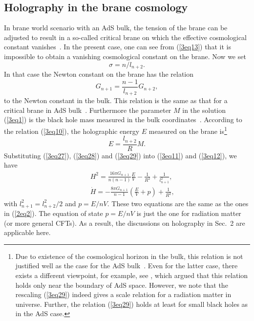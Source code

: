 \documentclass[a4paper,12pt]{article}
\begin{document}
 
\subsection{Holography in the brane cosmology}

In brane world scenario with an AdS bulk, the tension
of the brane can be adjusted to result in a so-called critical
brane on which the effective cosmological constant
vanishes~\cite{SV}. In the present case, one can see from (\ref{3eq13})
that it is impossible to obtain a vanishing cosmological constant on the 
brane. Now we set
\begin{equation}
\label{3eq27}
 \sigma = n/l_{n+2}.
\end{equation}
In that case the Newton constant on the brane has the
relation
\begin{equation}
\label{3eq28}
 G_{n+1} = \frac{n-1}{ l_{n+2}}G_{n+2},
\end{equation}
to the Newton constant in the bulk. This relation is the same
as that for a critical brane in AdS bulk~\cite{SV}.
Furthermore the parameter $M$ in the solution (\ref{3eq1}) is the
black hole mass measured in the bulk coordinates~\cite{AD}.
According to the relation (\ref{3eq10}), the holographic energy
$E$ measured on the brane is\footnote{Due to existence of the
cosmological horizon in the bulk, this relation is not justified
well as the case for the AdS bulk~\cite{SV}. Even for the latter
case, there exists a different viewpoint, for example, see
\cite{Padi}, which argued that this relation holds only near the
boundary of AdS space. However, we note that the rescaling
(\ref{3eq29}) indeed gives a scale relation for a radiation matter
in universe. Further, the relation (\ref{3eq29}) holds at least for 
small black holes as in the AdS case.}
\begin{equation}
\label{3eq29}
 E =\frac{l_{n+2}}{R}M.
\end{equation}
Substituting (\ref{3eq27}), (\ref{3eq28}) and (\ref{3eq29}) into
(\ref{3eq11}) and (\ref{3eq12}), we have
\begin{eqnarray}
\label{3eq30}
 && H^2 =\frac{16\pi G_{n+1}}{n(n-1)}\frac{E}{V}
-\frac{1}{R^2}
     +\frac{1}{l^2_{n+1}}, \nonumber \\
&& \dot H =-\frac{8\pi G_{n+1}}{n-1}\left (\frac{E}{V} +p\right)
    +\frac{1}{R^2},
\end{eqnarray}
with $l^2_{n+1}=l^2_{n+2}/2$ and $p=E/nV$. These two equations are the same 
as the ones in
(\ref{2eq2}).  The equation of state $p=E/nV$ is just the one for radiation 
matter (or more general CFTs). As a result, the discussions on holography 
in Sec.~2 are applicable here.
\end{document}
